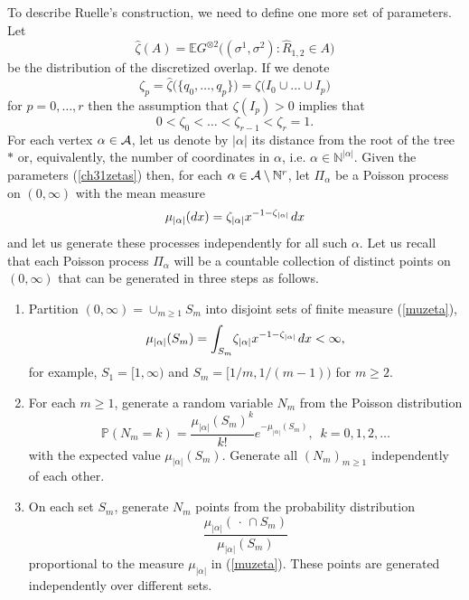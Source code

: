 \documentclass[12pt]{article}
\newcommand{\A}{{\cal A}}
\newcommand{\smsp}{\hspace{0.3mm}}
\newcommand{\e}{\mathbb{E}}
\newcommand{\p}{\mathbb{P}}
\newcommand{\Natural}{\mathbb{N}}
\theoremstyle{nonumberplain}
\begin{document}
To describe Ruelle's construction, we need to define one more set of parameters. Let
\begin{equation}
\hat{\zeta}(A) = \e G^{\otimes 2}\bigl((\sigma^1,\sigma^2) : \hat{R}_{1,2} \in A\bigr)
\label{GfopRSB}
\end{equation}
be the distribution of the discretized overlap. If we denote
\begin{equation}
\zeta_p = \hat{\zeta}\bigl(\bigl\{q_0,\ldots,q_p\bigr\}\bigr) = \zeta\bigl(I_0 \cup\ldots\cup I_p\bigr)
\label{ch30zetafop}
\end{equation}
for $p=0,\ldots, r$ then the assumption that $\zeta(I_p)>0$ implies that
\begin{equation}
0 <\zeta_0 <\ldots < \zeta_{r-1} <\zeta_r = 1.
\label{ch31zetas}
\end{equation}
For each vertex $\alpha\in \A$, let us denote by $|\alpha|$ its distance from the root of the tree $*$ or, equivalently, the number of coordinates in $\alpha$, i.e. $\alpha\in \Natural^{|\alpha|}.$ Given the parameters (\ref{ch31zetas}) then, for each $\alpha\in \A\setminus \Natural^r$, let $\Pi_\alpha$ be a Poisson process on $(0,\infty)$ with the mean measure 
\begin{equation}
\mu_{|\alpha|}(dx) = \zeta_{|\alpha|} x^{-1-\zeta_{|\alpha|}} \smsp dx
\label{muzeta}
\end{equation}
and let us generate these processes independently for all such $\alpha$. Let us recall that each Poisson process $\Pi_\alpha$ will be a countable collection of distinct points on $(0,\infty)$ that can be generated in three steps as follows. 
\begin{enumerate}
\item Partition $(0,\infty)=\cup_{m\geq 1}S_m$ into disjoint sets of finite measure (\ref{muzeta}), 
$$
\mu_{|\alpha|}(S_m) = \int_{S_m} \! \zeta_{|\alpha|} x^{-1-\zeta_{|\alpha|}}\smsp dx <\infty,
$$
for example, $S_1 = [1,\infty)$ and $S_m = [1/m,1/(m-1))$ for $m\geq 2$.

\item For each $m\geq 1$, generate a random variable $N_m$ from the Poisson distribution
$$
\p(N_m = k) = \frac{\mu_{|\alpha|}(S_m)^k}{k!} e^{-\mu_{|\alpha|}(S_m)},\,\,\, k=0,1,2,\ldots
$$
with the expected value $\mu_{|\alpha|}(S_m)$. Generate all $(N_m)_{m\geq 1}$ independently of each other.

\item On each set $S_m$, generate $N_m$ points from the probability distribution
$$
\frac{\mu_{|\alpha|}(\,\cdot\,\cap S_m)}{\mu_{|\alpha|}(S_m)}
$$ 
proportional to the measure $\mu_{|\alpha|}$ in (\ref{muzeta}). These points are generated independently over different sets.
\end{enumerate}
\end{document}
